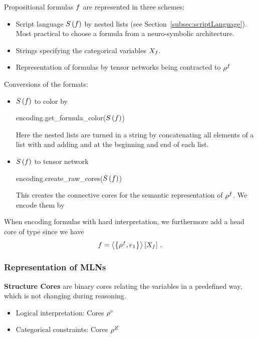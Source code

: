 Propositional formulas $f$ are represented in three schemes:
\begin{itemize}
	\item Script language $S\left(f\right)$ by nested lists (see Section~\ref{subsec:scriptLanguage}).
		Most practical to choose a formula from a neuro-symbolic architecture.
	\item Strings specifying the categorical variables $X_{f}$.
	\item Representation of formulas by tensor networks being contracted to $\rho^{f}$
\end{itemize}

Conversions of the formats:
\begin{itemize}
	\item $S\left(f\right)$ to color by
		\begin{centeredcode} 
			encoding.get\_formula\_color($S\left(f\right)$)
		\end{centeredcode}
		Here the nested lists are turned in a string by concatenating all elements of a list with \stringof{\_} and adding \stringof{[} and \stringof{]} at the beginning and end of each list.
	\item  $S\left(f\right)$ to tensor network 
		\begin{centeredcode}
			encoding.create\_raw\_cores($S\left(f\right)$)
		\end{centeredcode}
		This creates the connective cores for the semantic representation of $\rho^{f}$.
We encode them by
\end{itemize}

When encoding formulas with hard interpretation, we furthermore add a head core of type  since we have
 	\[ {f} = \left\langle \left\{\rho^{f},e_1\right\}\right\rangle \left[ X_{f} \right] \, . \]



\subsubsection{Representation of MLNs}

\textbf{Structure Cores} are binary cores relating the variables in a predefined way, which is not changing during reasoning.
\begin{itemize}
	\item Logical interpretation: Cores $\rho^{\circ}$ 
	\item Categorical constraints: Cores $\rho^{Z}$
\end{itemize}

